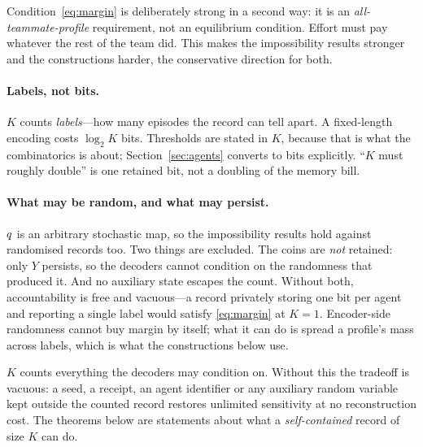 Condition~\eqref{eq:margin} is deliberately strong in a second way: it is an
\emph{all-teammate-profile} requirement, not an equilibrium condition. Effort
must pay whatever the rest of the team did. This makes the impossibility results
stronger and the constructions harder, the conservative direction for both.

\paragraph{Labels, not bits.}
$K$ counts \emph{labels}---how many episodes the record can tell apart. A
fixed-length encoding costs $\log_2 K$ bits. Thresholds are stated in $K$,
because that is what the combinatorics is about; Section~\ref{sec:agents}
converts to bits explicitly. ``$K$ must roughly double'' is one retained bit, not
a doubling of the memory bill.

\paragraph{What may be random, and what may persist.}
$q$ is an arbitrary stochastic map, so the impossibility results hold against
randomised records too. Two things are excluded. The coins are \emph{not}
retained: only $Y$ persists, so the decoders cannot condition on the randomness
that produced it. And no auxiliary state escapes the count. Without both,
accountability is free and vacuous---a record privately storing one bit per agent
and reporting a single label would satisfy \eqref{eq:margin} at $K=1$.
Encoder-side randomness cannot buy margin by itself; what it can do is spread a
profile's mass across labels, which is what the constructions below use.

\begin{remark}
\label{rem:counting}
$K$ counts everything the decoders may condition on. Without this the tradeoff is
vacuous: a seed, a receipt, an agent identifier or any auxiliary random variable
kept outside the counted record restores unlimited sensitivity at no
reconstruction cost. The theorems below are statements about what a
\emph{self-contained} record of size $K$ can do.
\end{remark}
